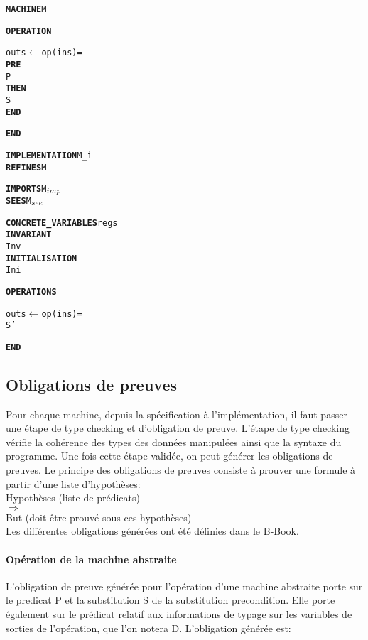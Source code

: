 \setlength{\columnseprule}{0.05cm}
\begin{multicols}{2}
\begin{alltt}
\textbf{MACHINE} M

\textbf{OPERATION}

outs \(\leftarrow\) op(ins) =
  \textbf{PRE}
    P
  \textbf{THEN}
    S
  \textbf{END}

\textbf{END}
\end{alltt}
\columnbreak
\begin{alltt}
\textbf{IMPLEMENTATION} M\_i
\textbf{REFINES} M

\textbf{IMPORTS} M\(\sb{imp}\)
\textbf{SEES} M\(\sb{see}\)

\textbf{CONCRETE\_VARIABLES} regs
\textbf{INVARIANT}
  Inv
\textbf{INITIALISATION}
  Ini

\textbf{OPERATIONS}
  
outs \(\leftarrow\) op(ins) =
  S'

\textbf{END}
\end{alltt}
\end{multicols}



\subsection{Obligations de preuves}

Pour chaque machine, depuis la spécification à l'implémentation, il faut
passer une étape de type checking et d'obligation de preuve. L'étape de type
checking vérifie la cohérence des types des données manipulées ainsi que la
syntaxe du programme. Une fois cette étape validée, on peut générer les
obligations de preuves. Le principe des obligations de preuves consiste à
prouver une formule à partir d'une liste d'hypothèses:\\
Hypothèses (liste de prédicats)\\
$\Rightarrow$\\
But (doit être prouvé sous ces hypothèses)\\
Les différentes obligations générées ont été définies dans le B-Book. 


\paragraph{Opération de la machine abstraite}
L'obligation de preuve générée pour l'opération d'une machine abstraite porte sur le predicat
P et la substitution S de la substitution precondition. Elle porte également sur
le prédicat relatif aux informations de typage sur les variables de sorties de
l'opération, que l'on notera D. L'obligation générée est:\\ 

